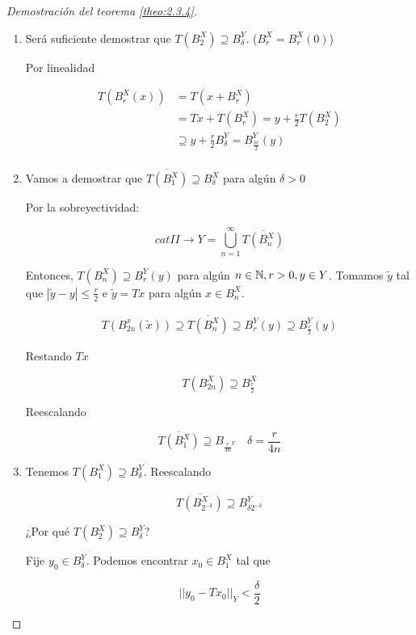 \begin{proof}[Demostración del teorema \ref{theo:2.3.4}]
    \begin{enumerate}
        \item Será suficiente demostrar que $T(B_2^X)\supseteq B_\delta^Y$. ($B_r^X=B_r^X(0)$)
        
        Por linealidad

        \begin{align*}
            T(B_r^X(x))&=T(x+B_r^X)\\
            &=Tx+T(B_r^X)={y+\frac{r}{2}T(B_2^X)}\\
            &\supseteq y+\frac{r}{2}B_\delta^Y=B_{\frac{\delta r}{2}}^Y(y)\\
        \end{align*}

        \item Vamos a demostrar que $\overline{T(B_1^X)}\supseteq B_\delta^X$ para algún $\delta>0$
        
        Por la sobreyectividad:

        \[cat II\rightarrow Y=\bigcup_{n=1}^\infty \overline{T(B_n^X)}\]

        Entonces, $T(B_n^X)\supseteq B_r^Y(y)$ para algún $n\in\mathbb{N},r>0,y\in Y$. Tomamos $\tilde y$ tal que $|\tilde y-y|\leq \frac{r}{2}$ e $\tilde y=Tx$ para algún $x\in B_n^X$.

        \begin{align*}
            T(B_{2n}^x(\tilde x))\supseteq \overline{T(B_n^X)}\supseteq B_r^Y(y)\supseteq B_{\frac{r}{2}}^Y(y)
        \end{align*}

        Restando $Tx$

        \[T(B_{2n}^X)\supseteq B_{\frac{r}{2}}^X\]

        Reescalando

        \[\overline{T(B_1^X)}\supseteq B_{\frac{r}{4n}^Y}\quad \delta=\frac{r}{4n}\]

        \item Tenemos $T(B_1^X)\supseteq B_\delta^Y$. Reescalando
        
        \[\overline{T(B_{2^{-k}}^X)}\supseteq B_{\delta 2^{-k}}^Y\]

        ¿Por qué $T(B_2^X)\supseteq B_\delta^Y$?

        Fije $y_0\in B_\delta^Y$. Podemos encontrar $x_0\in B_1^X$ tal que 

        \[||y_0-Tx_0||_Y<\frac{\delta}{2}\]


\end{enumerate}
\end{proof}
